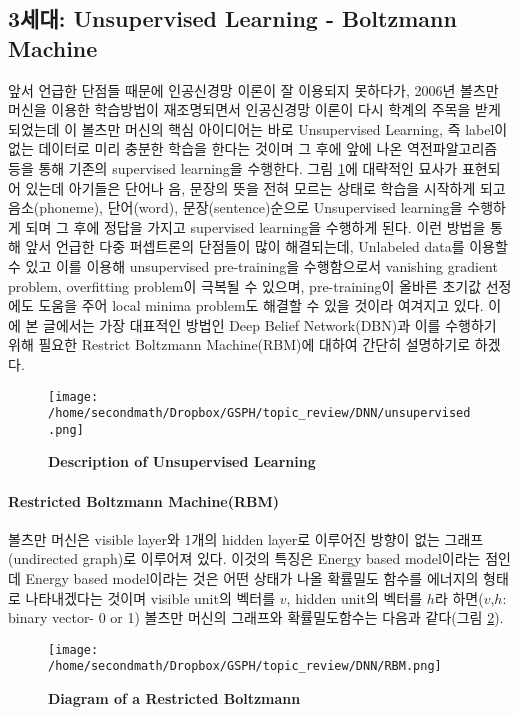 \documentclass[10pt]{article}
\begin{document}
\subsection{3세대: Unsupervised Learning - Boltzmann Machine}
앞서 언급한 단점들 때문에 인공신경망 이론이 잘 이용되지 못하다가, 2006년 볼츠만 머신을 이용한 학습방법이 재조명되면서 인공신경망 이론이 다시 학계의 주목을 받게 되었는데 이 볼츠만 머신의 핵심 아이디어는 바로 Unsupervised Learning, 즉 label이 없는 데이터로 미리 충분한 학습을 한다는 것이며 그 후에 앞에 나온 역전파알고리즘 등을 통해 기존의 supervised learning을 수행한다\cite{smolensky1986information,hinton2006reducing}. 그림 \ref{unsupervised}에 대략적인 묘사가 표현되어 있는데 아기들은 단어나 음, 문장의 뜻을 전혀 모르는 상태로 학습을 시작하게 되고 음소(phoneme),  단어(word), 문장(sentence)순으로 Unsupervised learning을 수행하게 되며 그 후에 정답을 가지고 supervised learning을 수행하게 된다\cite{kimjunmoppt}. 이런 방법을 통해 앞서 언급한 다중 퍼셉트론의 단점들이 많이 해결되는데, Unlabeled data를 이용할 수 있고 이를 이용해 unsupervised pre-training을 수행함으로서 vanishing gradient problem, overfitting problem이 극복될 수 있으며, pre-training이 올바른 초기값 선정에도 도움을 주어 local minima problem도 해결할 수 있을 것이라 여겨지고 있다\cite{bengio2009learning}. 이에 본 글에서는 가장 대표적인 방법인 Deep Belief Network(DBN)과 이를 수행하기 위해 필요한 Restrict Boltzmann Machine(RBM)에 대하여 간단히 설명하기로 하겠다. 

\begin{figure}[!ht]
\centering
\texttt{[image: /home/secondmath/Dropbox/GSPH/topic\_review/DNN/unsupervised.png]}
\caption{\bf{Description of Unsupervised Learning}}
\label{unsupervised}
\end{figure}

\paragraph{Restricted Boltzmann Machine(RBM)}
볼츠만 머신은 visible layer와 1개의 hidden layer로 이루어진 방향이 없는 그래프(undirected graph)로 이루어져 있다. 이것의 특징은 Energy based model이라는 점인데 Energy based model이라는 것은 어떤 상태가 나올 확률밀도 함수를 에너지의 형태로 나타내겠다는 것이며  visible unit의 벡터를 $v$, hidden unit의 벡터를 $h$라 하면($v$,$h$: binary vector- 0 or 1) 볼츠만 머신의 그래프와 확률밀도함수는 다음과 같다(그림 \ref{RBM})\cite{lecun2006tutorial,lecun2005loss}.

\begin{figure}[!ht]
\centering
\texttt{[image: /home/secondmath/Dropbox/GSPH/topic\_review/DNN/RBM.png]}
\caption{\bf{Diagram of a Restricted Boltzmann\cite{RBMfigure}}}
\label{RBM}
\end{figure}
\end{document}
